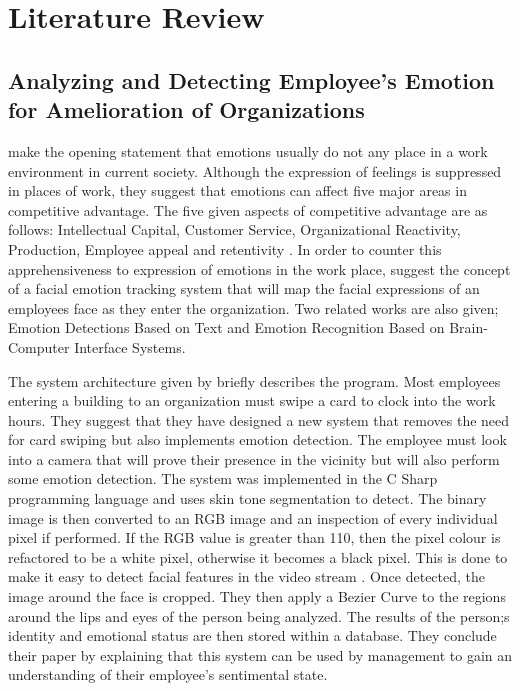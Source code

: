 \chapter{Literature Review}


\section{Analyzing and Detecting Employee's Emotion for Amelioration of Organizations}

\citeauthor{SUBHASHINI} make the opening statement that emotions usually do not any place in a work environment in current society. Although the expression of feelings is suppressed in places of work, they suggest that emotions can affect five major areas in competitive advantage. The five given aspects of competitive advantage are as follows: Intellectual Capital, Customer Service, Organizational Reactivity, Production, Employee appeal and retentivity \citep{SUBHASHINI}. In order to counter this apprehensiveness to expression of emotions in the work place, \citeauthor{SUBHASHINI} suggest the concept of a facial emotion tracking system that will map the facial expressions of an employees face as they enter the organization. Two related works are also given; Emotion Detections Based on Text and Emotion Recognition Based on Brain-Computer Interface Systems. 

The system architecture given by \citeauthor{SUBHASHINI} briefly describes the program. Most employees entering a building to an organization must swipe a card to clock into the work hours. They suggest that they have designed a new system that removes the need for card swiping but also implements emotion detection. The employee must look into a camera that will prove their presence in the vicinity but will also perform some emotion detection. The system was implemented in the C Sharp programming language and uses skin tone segmentation to detect. The binary image is then converted to an RGB image and an inspection of every individual pixel if performed. If the RGB value is greater than 110, then the pixel colour is refactored to be a white pixel, otherwise it becomes a black pixel. This is done to make it easy to detect facial features in the video stream \citep{SUBHASHINI}. Once detected, the image around the face is cropped. They then apply a Bezier Curve to the regions around the lips and eyes of the person being analyzed. The results of the person;s identity and emotional status are then stored within a database. They conclude their paper by explaining that this system can be used by management to gain an understanding of their employee's sentimental state. 
\\

